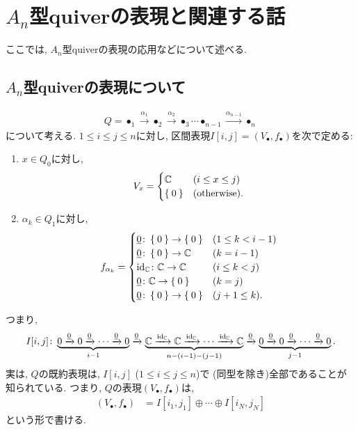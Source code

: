 \section{$A_n$型quiverの表現と関連する話}
ここでは,
$A_n$型quiverの表現の応用などについて述べる.
\subsection{$A_n$型quiverの表現について}
\begin{align*}
Q=\bullet_1\xrightarrow{\alpha_1}\bullet_2\xrightarrow{\alpha_2}\bullet_3\cdots \bullet_{n-1}\xrightarrow{\alpha_{n-1}}\bullet_n
\end{align*}
について考える.
$1\leq i\leq j\leq n$に対し,
区間表現$I[i,j]=(V_\bullet,f_\bullet)$を次で定める:
\begin{enumerate}
\item
  $x\in Q_0$に対し,
  \begin{align*}
    V_x=
    \begin{cases}
      \mathbb{C} & (i\leq x \leq j)\\
      \Set{0} & (\text{otherwise}).
    \end{cases}
  \end{align*}
\item
  $\alpha_k\in Q_1$に対し,
  \begin{align*}
    f_{\alpha_k}=
    \begin{cases}
      \underline{0}\colon\Set{0} \to \Set{0} & (1\leq k < i-1)\\
      \underline{0}\colon\Set{0} \to \mathbb{C} & (k=i-1)\\
      \operatorname{id}_{\mathbb{C}}\colon\mathbb{C} \to \mathbb{C} & (i\leq k < j)\\
      \underline{0}\colon\mathbb{C} \to \Set{0} & (k=j)\\
      \underline{0}\colon\Set{0} \to \Set{0} & (j+1\leq k).
    \end{cases}
  \end{align*}  
\end{enumerate}
つまり,
\begin{align*}
  I[i,j]\colon
  \underbrace{0\xrightarrow{\underline{0}}
  0\xrightarrow{\underline{0}} \cdots \xrightarrow{\underline{0}}
  0}_{i-1}\xrightarrow{\underline{0}}
  \underbrace{\mathbb{C} \xrightarrow{\operatorname{id}_{\mathbb{C}}}
  \mathbb{C} \xrightarrow{\operatorname{id}_{\mathbb{C}}} \cdots\xrightarrow{\operatorname{id}_{\mathbb{C}}}\mathbb{C}}_{n-(i-1)-(j-1)} \xrightarrow{\underline{0}}
  \underbrace{0\xrightarrow{\underline{0}}
  0\xrightarrow{\underline{0}} \cdots \xrightarrow{\underline{0}}
  0}_{j-1}.
\end{align*}
実は,
$Q$の既約表現は, $I[i,j]$ ($1\leq i\leq j \leq n$)で
(同型を除き)全部であることが知られている.
つまり, $Q$の表現$(V_\bullet,f_\bullet)$は,
\begin{align*}
  (V_\bullet,f_\bullet)
  &=I[i_1,j_1]\oplus\cdots\oplus I[i_N,j_N]
\end{align*}
という形で書ける.

